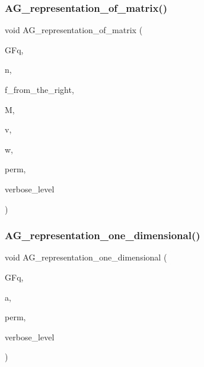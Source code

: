 \subsubsection{\texorpdfstring{A\+G\+\_\+representation\+\_\+of\+\_\+matrix()}{AG\_representation\_of\_matrix()}}
{\footnotesize\ttfamily void A\+G\+\_\+representation\+\_\+of\+\_\+matrix (\begin{DoxyParamCaption}\item[{\mbox{\hyperlink{classfinite__field}{finite\+\_\+field}} \&}]{G\+Fq,  }\item[{\mbox{\hyperlink{galois_8h_a09fddde158a3a20bd2dcadb609de11dc}{I\+NT}}}]{n,  }\item[{\mbox{\hyperlink{galois_8h_a09fddde158a3a20bd2dcadb609de11dc}{I\+NT}}}]{f\+\_\+from\+\_\+the\+\_\+right,  }\item[{\mbox{\hyperlink{galois_8h_a09fddde158a3a20bd2dcadb609de11dc}{I\+NT}} $\ast$}]{M,  }\item[{\mbox{\hyperlink{galois_8h_a09fddde158a3a20bd2dcadb609de11dc}{I\+NT}} $\ast$}]{v,  }\item[{\mbox{\hyperlink{galois_8h_a09fddde158a3a20bd2dcadb609de11dc}{I\+NT}} $\ast$}]{w,  }\item[{\mbox{\hyperlink{galois_8h_a09fddde158a3a20bd2dcadb609de11dc}{I\+NT}} $\ast$}]{perm,  }\item[{\mbox{\hyperlink{galois_8h_a09fddde158a3a20bd2dcadb609de11dc}{I\+NT}}}]{verbose\+\_\+level }\end{DoxyParamCaption})}

\mbox{\label{group__generators_8_c_ad1b5ceadf494f7bd695a204ae1a89dd3}} 
\subsubsection{\texorpdfstring{A\+G\+\_\+representation\+\_\+one\+\_\+dimensional()}{AG\_representation\_one\_dimensional()}}
{\footnotesize\ttfamily void A\+G\+\_\+representation\+\_\+one\+\_\+dimensional (\begin{DoxyParamCaption}\item[{\mbox{\hyperlink{classfinite__field}{finite\+\_\+field}} \&}]{G\+Fq,  }\item[{\mbox{\hyperlink{galois_8h_a09fddde158a3a20bd2dcadb609de11dc}{I\+NT}}}]{a,  }\item[{\mbox{\hyperlink{galois_8h_a09fddde158a3a20bd2dcadb609de11dc}{I\+NT}} $\ast$}]{perm,  }\item[{\mbox{\hyperlink{galois_8h_a09fddde158a3a20bd2dcadb609de11dc}{I\+NT}}}]{verbose\+\_\+level }\end{DoxyParamCaption})}


